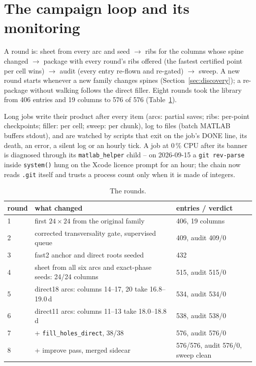 \documentclass[11pt]{article}
\newcommand{\code}[1]{\texttt{#1}}
\begin{document}
\section{The campaign loop and its monitoring}

A round is: sheet from every arc and seed $\to$ ribs for the columns
whose spine changed $\to$ package with every round's ribs offered (the
fastest certified point per cell wins) $\to$ audit (every entry re-flown
and re-gated) $\to$ sweep. A new round starts whenever a new family
changes spines (Section~\ref{sec:discovery}); a re-package without
walking follows the direct filler. Eight rounds took the library from 406
entries and 19 columns to 576 of 576 (Table~\ref{tab:rounds}).

Long jobs write their product after every item (arcs: partial saves;
ribs: per-point checkpoints; filler: per cell; sweep: per chunk), log to
files (batch MATLAB buffers stdout), and are watched by scripts that exit
on the job's DONE line, its death, an error, a silent log or an hourly
tick. A job at 0\,\% CPU after its banner is diagnosed through its
\code{matlab\_helper} child -- on 2026-09-15 a \code{git rev-parse} inside
\code{system()} hung on the Xcode licence prompt for an hour; the chain
now reads \code{.git} itself and trusts a process count only when it is
made of integers.

\begin{table}[h]\centering\small
\caption{The rounds.}
\label{tab:rounds}
\begin{tabular}{lp{}l}
\toprule
round & what changed & entries / verdict \\
\midrule
1 & first $24\times24$ from the original family & 406, 19 columns \\
2 & corrected transversality gate, supervised queue & 409, audit 409/0 \\
3 & fast2 anchor and direct roots seeded & 432 \\
4 & sheet from all six arcs and exact-phase seeds: 24/24 columns & 515, audit 515/0 \\
5 & direct18 arcs: columns 14--17, 20 take 16.8--19.0\,d & 534, audit 534/0 \\
6 & direct11 arcs: columns 11--13 take 18.0--18.8\,d & 538, audit 538/0 \\
7 & + \code{fill\_holes\_direct}, 38/38 & 576, audit 576/0 \\
8 & + improve pass, merged sidecar & 576/576, audit 576/0, sweep clean \\
\bottomrule
\end{tabular}
\end{table}
\end{document}

